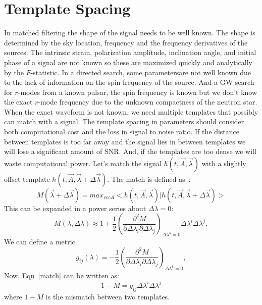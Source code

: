 \documentclass{ttuthes2007}
\begin{document}
\section{Template Spacing}
In matched filtering the shape of the signal needs to be well known. The shape
is
determined by the sky location, frequency and the frequency derivatives of the
sources. The intrinsic strain, polarization amplitude, inclination angle, and
initial phase of a signal are not known so these are maximized quickly and
analytically by the $F$-statistic. In a
directed search, some parametersare not well known due to the lack of
information on the spin frequency of the source. And a \ac{GW} search for
$r$-modes
from a known pulsar, the spin frequency is known but we don't know the exact
$r$-mode frequency due to the unknown compactness of the neutron star. When the
exact waveform is not known, we need multiple templates that possibly can
match with a signal. The template spacing in parameters should consider both computational
cost and the loss in signal to noise ratio. If the distance between templates is
too far away
and the signal lies in between templates we will lose a significant amount of
\ac{SNR}. And, if the templates are too dense we will waste computational
power.  Let's match the signal $h(t,\vec{A},\vec{\lambda})$ with a slightly offset template
 $h(t,\vec{A},\vec{\lambda}+\Delta\vec{\lambda})$. The match is defined
as~\cite{Owen_1996}:
\begin{equation}
M(\vec{\lambda}+\Delta\vec{\lambda}) =
max_{vec{A}}<h(t,\vec{A},\vec{\lambda})|h(t,\vec{A},\vec{\lambda}+\Delta\vec{\lambda})>
\end{equation}
This can be expanded in a power series about $\Delta\lambda=0$:
\begin{equation}\label{match}
M(\lambda,\Delta\lambda)\approx
1+\frac{1}{2}\left(\frac{\partial^2M}{\partial\Delta\lambda_i\partial\Delta\lambda_j}\right)_{\Delta\lambda^k=0}
\Delta\lambda^i\Delta\lambda^j,
\end{equation}
We can define a metric 
\begin{equation}
g_{ij}(\lambda)=-\frac{1}{2}\left(\frac{\partial^2M}{\partial\Delta\lambda_i\partial\Delta\lambda_j}\right)_{\Delta\lambda^k=0},
\end{equation}
Now, Eqn~\ref{match} can be written as:
\begin{equation}
1-M=g_{ij} \Delta\lambda^i\Delta\lambda^j
\end{equation}
where $1-M$ is the mismatch between two templates.
\end{document}
